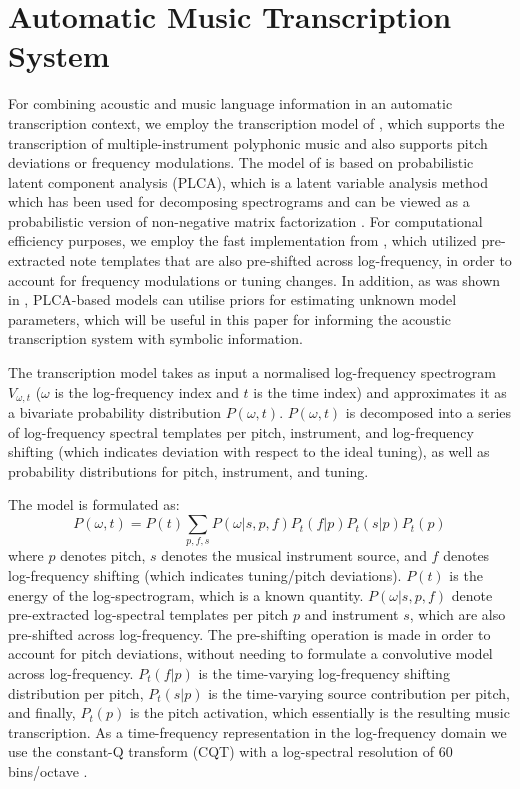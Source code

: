 \section{Automatic Music Transcription System} \label{sec:transcription}


For combining acoustic and music language information in an automatic transcription context, we employ the transcription model of \cite{Benetos2012}, which supports the transcription of multiple-instrument polyphonic music and also supports pitch deviations or frequency modulations. The model of \cite{Benetos2012} is based on probabilistic latent component analysis (PLCA), which is a latent variable analysis method which has been used for decomposing spectrograms \cite{Shashanka2008} and can be viewed as a probabilistic version of non-negative matrix factorization \cite{Li1999}. For computational efficiency purposes, we employ the fast implementation from \cite{Benetos2013}, which utilized pre-extracted note templates that are also pre-shifted across log-frequency, in order to account for frequency modulations or tuning changes. In addition, as was shown in \cite{Smaragdis2009}, PLCA-based models can utilise priors for estimating unknown model parameters, which will be useful in this paper for informing the acoustic transcription system with symbolic information.

The transcription model takes as input a normalised log-frequency spectrogram $V_{\omega,t}$ ($\omega$ is the log-frequency index and $t$ is the time index) and approximates it as a bivariate probability distribution $P(\omega,t)$. $P(\omega,t)$ is decomposed into a series of log-frequency spectral templates per pitch, instrument, and log-frequency shifting (which indicates deviation with respect to the ideal tuning), as well as probability distributions for pitch, instrument, and tuning. 

The model is formulated as:
\begin{equation}
P(\omega,t) = P(t)\sum_{p,f,s}P(\omega|s,p,f)P_{t}(f|p)P_{t}(s|p)P_{t}(p) \label{eq:Model}
\end{equation} 
where $p$ denotes pitch, $s$ denotes the musical instrument source, and $f$ denotes log-frequency shifting (which indicates tuning/pitch deviations). $P(t)$ is the energy of the log-spectrogram, which is a known quantity. $P(\omega|s,p,f)$ denote pre-extracted log-spectral templates per pitch $p$ and instrument $s$, which are also pre-shifted across log-frequency. The pre-shifting operation is made in order to account for pitch deviations, without needing to formulate a convolutive model across log-frequency. $P_{t}(f|p)$ is the time-varying log-frequency shifting distribution per pitch, $P_{t}(s|p)$ is the time-varying source contribution per pitch, and finally, $P_{t}(p)$ is the pitch activation, which essentially is the resulting music transcription. As a time-frequency representation in the log-frequency domain we use the constant-Q transform (CQT) with a log-spectral resolution of 60 bins/octave \cite{Schoerkhuber10}.

